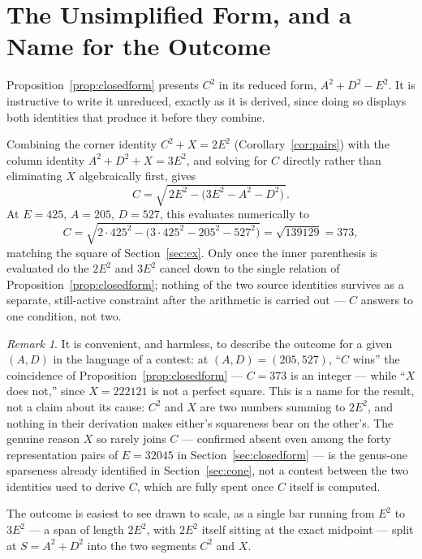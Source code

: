 \documentclass[12pt]{article}
\theoremstyle{remark}
\newtheorem{remark}[theorem]{Remark}
\begin{document}
\section{The Unsimplified Form, and a Name for the Outcome}\label{sec:unsimplified}

Proposition~\ref{prop:closedform} presents $C^2$ in its reduced form,
$A^2+D^2-E^2$. It is instructive to write it unreduced, exactly as it
is derived, since doing so displays both identities that produce it
before they combine.

Combining the corner identity $C^2+X=2E^2$ (Corollary~\ref{cor:pairs})
with the column identity $A^2+D^2+X=3E^2$, and solving for $C$ directly
rather than eliminating $X$ algebraically first, gives
\[
C = \sqrt{\,2E^2 - \bigl(3E^2 - A^2 - D^2\bigr)\,} .
\]
At $E=425$, $A=205$, $D=527$, this evaluates numerically to
\[
C = \sqrt{2\cdot425^2 - \bigl(3\cdot425^2 - 205^2 - 527^2\bigr)}
  = \sqrt{139129} = 373 ,
\]
matching the square of Section~\ref{sec:ex}. Only once the inner
parenthesis is evaluated do the $2E^2$ and $3E^2$ cancel down to the
single relation of Proposition~\ref{prop:closedform}; nothing of the
two source identities survives as a separate, still-active constraint
after the arithmetic is carried out --- $C$ answers to one condition,
not two.

\begin{remark}
It is convenient, and harmless, to describe the outcome for a given
$(A,D)$ in the language of a contest: at $(A,D)=(205,527)$, ``$C$
wins'' the coincidence of Proposition~\ref{prop:closedform} --- $C=373$
is an integer --- while ``$X$ does not,'' since $X=222121$ is not a
perfect square. This is a name for the result, not a claim about its
cause: $C^2$ and $X$ are two numbers summing to $2E^2$, and nothing in
their derivation makes either's squareness bear on the other's. The
genuine reason $X$ so rarely joins $C$ --- confirmed absent even among
the forty representation pairs of $E=32045$ in
Section~\ref{sec:closedform} --- is the genus-one sparseness already
identified in Section~\ref{sec:cone}, not a contest between the two
identities used to derive $C$, which are fully spent once $C$ itself is
computed.
\end{remark}

The outcome is easiest to see drawn to scale, as a single bar running from
$E^2$ to $3E^2$ --- a span of length $2E^2$, with $2E^2$ itself sitting
at the exact midpoint --- split at $S=A^2+D^2$ into the two segments
$C^2$ and $X$.
\end{document}
